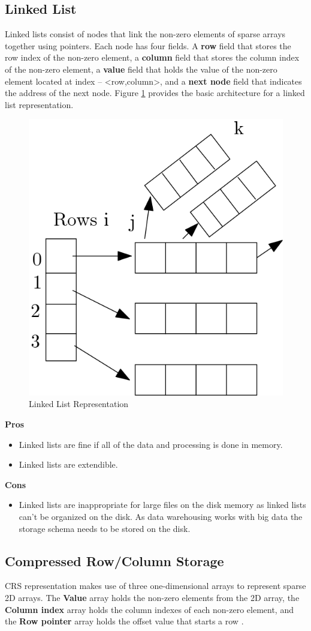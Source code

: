 \subsection{Linked List}
Linked lists  consist of nodes that link the non-zero elements of sparse arrays together using pointers. Each node has four fields. A \textbf{row} field that stores the row index of the non-zero element, a \textbf{column} field that stores the column index of the non-zero element, a \textbf{value} field that holds the value of the non-zero element located at index – <row,column>, and a \textbf{next node} field that indicates the address of the next node. Figure \ref{fig:linkedList} provides the basic architecture for a linked list representation.

 \begin{figure}[H]
	\centering
	\includegraphics[width=0.3\linewidth]{LinkedList}
	\caption{Linked List Representation}
	\label{fig:linkedList}
\end{figure}

\textbf{Pros}
\begin{itemize}
	\item Linked lists are fine if all of the data and processing is done in memory.
	\item Linked lists are extendible.
\end{itemize}

\textbf{Cons}
\begin{itemize}
	\item Linked lists are inappropriate for large files on the disk memory as linked lists can't be organized on the disk. As data warehousing works with big data the storage schema needs to be stored on the disk. 
\end{itemize}

\subsection{Compressed Row/Column Storage}

 CRS representation makes use of three one-dimensional arrays to represent sparse 2D arrays. The \textbf{Value} array holds the non-zero elements from the 2D array, the \textbf{Column index} array holds the column indexes of each non-zero element, and the \textbf{Row pointer} array holds the offset value that starts a row \cite{wang:2014sar}.
 
